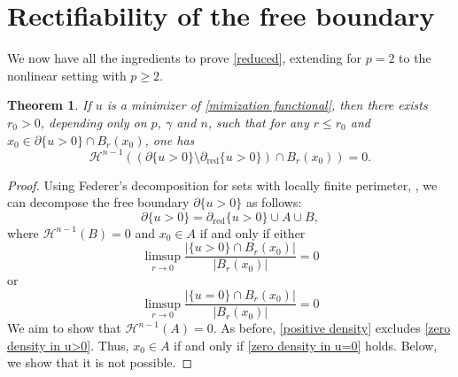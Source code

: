 \documentclass[11pt, reqno]{amsart}
\newtheorem{theorem}{Theorem}
\numberwithin{equation}{section}
\numberwithin{theorem}{section}
\numberwithin{lemma}{section}
\numberwithin{corollary}{section}
\numberwithin{remark}{section}
\numberwithin{proposition}{section}
\numberwithin{definition}{section}
\def \H {\mathcal{H}^{n-1}}
\newcommand{\reduced}{\operatorname{red}}
\begin{document}
\section{Rectifiability of the free boundary}\label{s5}
We now have all the ingredients to prove \eqref{reduced}, extending \cite[Theorem 3.2]{Ph83} for $p=2$ to the nonlinear setting with $p\ge2$.
\begin{theorem}\label{Hausdorff reduced}
If $u$ is a minimizer of \eqref{mimization functional}, then there exists $r_0>0$, depending only on $p$, $\gamma$ and $n$, such that for any $r\le r_0$ and $x_0\in\partial\{u>0\}\cap B_r(x_0)$, one has
$$
    \mathcal{H}^{n-1}\left((\partial\{u>0\}\setminus\partial_{\reduced}\{u>0\})\cap B_r(x_0)\right)=0.
$$
\end{theorem}
\begin{proof}
Using Federer's decomposition for sets with locally finite perimeter, \cite[Section 4.5.6, page 478]{F69}, we can decompose the free boundary $\partial\{u>0\}$ as follows:
$$
\partial\{u>0\}=\partial_{\reduced}\{u>0\}\cup A\cup B,
$$
where $\H(B)=0$ and $x_0\in A$ if and only if either 
\begin{equation}\label{zero density in u>0}
    \limsup_{r\to0}\frac{|\{u>0\}\cap B_r(x_0)|}{|B_r(x_0)|}=0
\end{equation}
or
\begin{equation}\label{zero density in u=0}
    \limsup_{r\to0}\frac{|\{u=0\}\cap B_r(x_0)|}{|B_r(x_0)|}=0
\end{equation}
We aim to show that $\H(A)=0$. As before, \eqref{positive density} excludes \eqref{zero density in u>0}. Thus, $x_0\in A$ if and only if \eqref{zero density in u=0} holds. Below, we show that it is not possible.


\end{proof}
\end{document}
